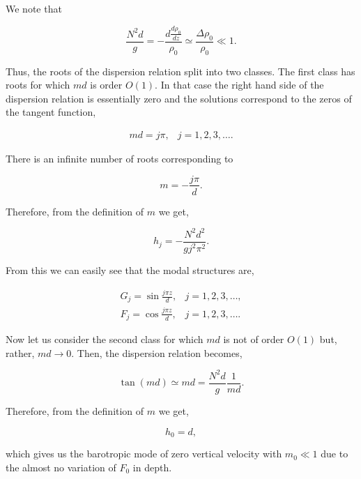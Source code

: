 \documentclass[11pt]{article}
\begin{document}
We note that

\begin{equation*}
\frac{N^2 d}{g}=-\frac{d \frac{d\rho_0}{dz}}{\rho_0}\simeq \frac{\Delta\rho_0}{\rho_0} \ll 1.
\end{equation*}

Thus, the roots of the dispersion relation split into two classes.
The first class has roots for which $m d$ is order $O(1)$. In that case the right hand side of the dispersion relation is essentially zero and the solutions correspond to the zeros of the tangent function,

\begin{equation*}
\begin{array}{cc}
m d=j\pi, & j=1,2,3,\ldots.
\end{array}
\end{equation*}

There is an infinite number of roots corresponding to

\begin{equation*}
m=-\frac{j\pi}{d}.
\end{equation*}

Therefore, from the definition of $m$ we get,

\begin{equation*}
h_j=-\frac{N^2 d^2}{g j^2 \pi^2}.
\end{equation*}

From this we can easily see that the modal structures are,

\begin{equation*}
\begin{array}{cc}
G_j=\sin\frac{j \pi z}{d},& j=1,2,3,\ldots, \\
F_j=\cos\frac{j \pi z}{d},& j=1,2,3,\ldots.
\end{array}
\end{equation*}

Now let us consider the second class for which $m d$ is not of order $O(1)$ but, rather, $m d\rightarrow0$. Then, the dispersion relation becomes,


\begin{equation*}
\tan (m d) \simeq m d = \frac{N^2 d}{g}\frac{1}{m d}.
\end{equation*}

Therefore, from the definition of $m$ we get,

\begin{equation*}
h_0=d,
\end{equation*}

which gives us the barotropic mode of zero vertical velocity with $m_0 \ll 1$ due to the almost no variation of $F_0$ in depth.
\end{document}
